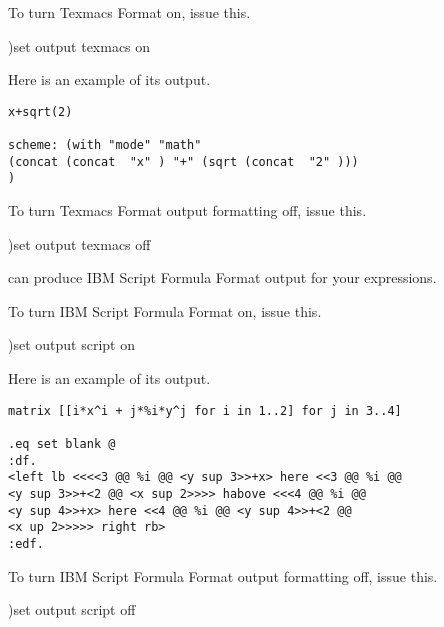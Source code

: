 \begin{noOutputXtc}
\begin{xtccomment}
To turn Texmacs Format on, issue this.
\end{xtccomment}
\begin{spadsrc}
)set output texmacs on
\end{spadsrc}
\end{noOutputXtc}
Here is an example of its output.
\begin{verbatim}
x+sqrt(2)

scheme: (with "mode" "math"
(concat (concat  "x" ) "+" (sqrt (concat  "2" )))
)
\end{verbatim}
\begin{noOutputXtc}
\begin{xtccomment}
To turn Texmacs Format output formatting off, issue this.
\end{xtccomment}
\begin{spadsrc}
)set output texmacs off
\end{spadsrc}
\end{noOutputXtc}
%

\Language{} can
produce IBM Script Formula Format output for your
expressions.

\begin{noOutputXtc}
\begin{xtccomment}
To turn IBM Script Formula Format on, issue this.
\end{xtccomment}
\begin{spadsrc}
)set output script on
\end{spadsrc}
\end{noOutputXtc}
Here is an example of its output.
\begin{verbatim}
matrix [[i*x^i + j*%i*y^j for i in 1..2] for j in 3..4]

.eq set blank @
:df.
<left lb <<<<3 @@ %i @@ <y sup 3>>+x> here <<3 @@ %i @@
<y sup 3>>+<2 @@ <x sup 2>>>> habove <<<4 @@ %i @@
<y sup 4>>+x> here <<4 @@ %i @@ <y sup 4>>+<2 @@
<x up 2>>>>> right rb>
:edf.
\end{verbatim}
\begin{noOutputXtc}
\begin{xtccomment}
To turn IBM Script Formula Format output formatting off, issue this.
\end{xtccomment}
\begin{spadsrc}
)set output script off
\end{spadsrc}
\end{noOutputXtc}

